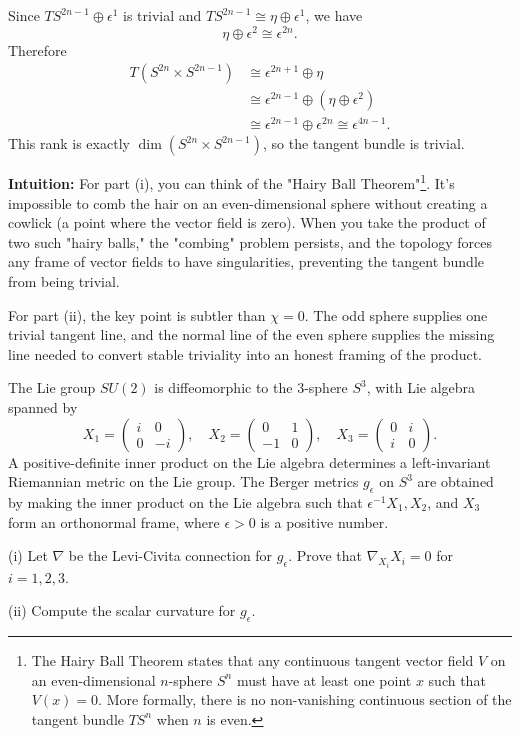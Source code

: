 \begin{solution}
\begin{enumerate}
\[    \]
    Since $TS^{2n-1}\oplus\epsilon^1$ is trivial and
    $TS^{2n-1}\cong\eta\oplus\epsilon^1$, we have
    \[
        \eta\oplus\epsilon^2\cong\epsilon^{2n}.
    \]
    Therefore
    \[
    \begin{aligned}
        T(S^{2n}\times S^{2n-1})
        &\cong \epsilon^{2n+1}\oplus\eta \\
        &\cong \epsilon^{2n-1}\oplus(\eta\oplus\epsilon^2) \\
        &\cong \epsilon^{2n-1}\oplus\epsilon^{2n}
         \cong \epsilon^{4n-1}.
    \end{aligned}
    \]
    This rank is exactly $\dim(S^{2n}\times S^{2n-1})$, so the tangent bundle is
    trivial.
\end{enumerate}
\textbf{Intuition:}
For part (i), you can think of the "Hairy Ball Theorem"\footnote{The Hairy Ball Theorem states that any continuous tangent vector field $V$ on an even-dimensional $n$-sphere $S^n$ must have at least one point $x$ such that $V(x) = 0$. More formally, there is no non-vanishing continuous section of the tangent bundle $TS^n$ when $n$ is even.}. It's impossible to comb the hair on an even-dimensional sphere without creating a cowlick (a point where the vector field is zero). When you take the product of two such "hairy balls," the "combing" problem persists, and the topology forces any frame of vector fields to have singularities, preventing the tangent bundle from being trivial.

For part (ii), the key point is subtler than $\chi=0$. The odd sphere supplies
one trivial tangent line, and the normal line of the even sphere supplies the
missing line needed to convert stable triviality into an honest framing of the
product.
\end{solution}

\begin{exercise}
\label{geometry:2025:2}
The Lie group $SU(2)$ is diffeomorphic to the 3-sphere $S^{3}$, with Lie algebra spanned by
\[
X_{1} = \begin{pmatrix} i & 0 \\ 0 & -i \end{pmatrix}, \quad X_{2} = \begin{pmatrix} 0 & 1 \\ -1 & 0 \end{pmatrix}, \quad X_{3} = \begin{pmatrix} 0 & i \\ i & 0 \end{pmatrix}.
\]
A positive-definite inner product on the Lie algebra determines a left-invariant Riemannian metric on the Lie group. The Berger metrics $g_{\epsilon}$ on $S^{3}$ are obtained by making the inner product on the Lie algebra such that $\epsilon^{-1}X_{1}, X_{2}$, and $X_{3}$ form an orthonormal frame, where $\epsilon > 0$ is a positive number.

(i) Let $\nabla$ be the Levi-Civita connection for $g_{\epsilon}$. Prove that $\nabla_{X_{i}}X_{i} = 0$ for $i = 1, 2, 3$.

(ii) Compute the scalar curvature for $g_{\epsilon}$.
\end{exercise}

